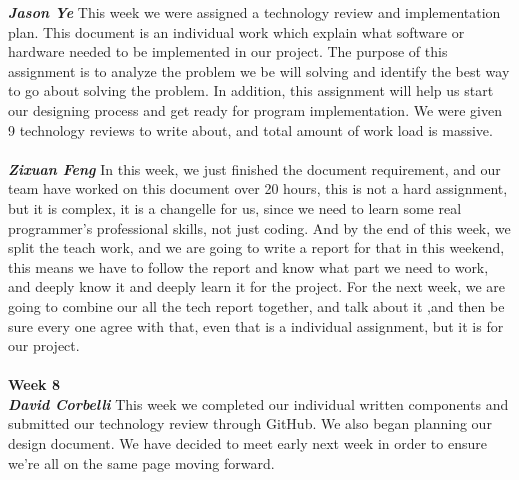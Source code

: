 \documentclass[onecolumn, draftclsnofoot,10pt, compsoc]{IEEEtran}
\begin{document}
\textbf{\textit{Jason Ye}}
This week we were assigned a technology review and implementation plan. This document is an individual work which explain what software or hardware needed to be implemented in our project. The purpose of this assignment is to analyze the problem we be will solving and identify the best way to go about solving the problem. In addition, this assignment will help us start our designing process and get ready for program implementation. We were given 9 technology reviews to write about, and total amount of work load is massive.\\ \\
\textbf{\textit{Zixuan Feng}}
In this week, we just finished the document requirement, and our team have worked on this document over 20 hours, this is not a hard assignment, but it is complex, it is a changelle for us, since we need to learn some real programmer's professional skills, not just coding. And by the end of this week, we split the teach work, and we are going to write a report for that in this weekend, this means we have to follow the report and know what part we need to work, and deeply know it and deeply learn it for the project. For the next week, we are going to combine our all the tech report together, and talk about it ,and then be sure every one agree with that, even that is a individual assignment, but it is for our project.\\ \\
\textbf{Week 8}
\\ \textbf{\textit{David Corbelli}}
This week we completed our individual written components and submitted our technology review through GitHub. We also began planning our design document. We have decided to meet early next week in order to ensure we're all on the same page moving forward.\\ \\
\end{document}
